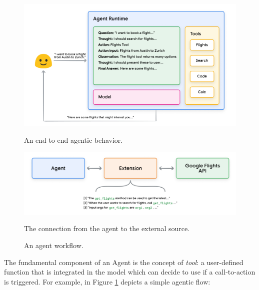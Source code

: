 \begin{figure}[h]
    \centering
    \begin{minipage}{0.45\textwidth}
        \centering
        \includegraphics[width=\textwidth]{images/agents.png}
        \caption{An end-to-end agentic behavior.}
    \end{minipage}
    \hfill
    \begin{minipage}{0.45\textwidth}
        \centering
        \includegraphics[width=\textwidth]{images/agents-ii.png}
        \caption{The connection from the agent to the external source.}
    \end{minipage}
    \caption{An agent workflow.}
    \label{fig:agent-ai}
\end{figure}

The fundamental component of an Agent is the concept of \textit{tool}: a user-defined function that is integrated in the model which can decide to use if a call-to-action is triggered. For example, in Figure \ref{fig:agent-ai} depicts a simple agentic flow:


